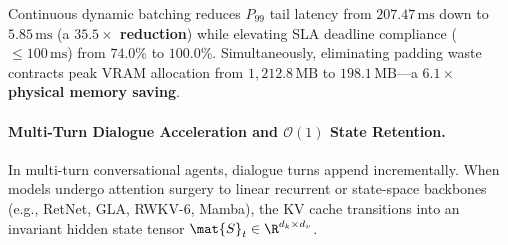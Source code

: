 \begin{table}[t]
\centering
\small
\caption[Dynamic Batch Scheduling vs Static Batching]{\textbf{Dynamic Batch Scheduling vs. Static Batching under Poisson Arrival Process ($N=100$ requests, $L \in [256, 4{,}096]$) on Physical NVIDIA RTX 4070 (AD104, SM 8.9).} Continuous iteration-level dynamic batching eliminates batch queue head-of-line blocking and padding waste. Across 100 stochastic arrivals ($230{,}229$ total tokens), continuous scheduling reduces $P_{99}$ latency from $207.47\,\text{ms}$ down to $5.85\,\text{ms}$ ($35.5\times$ reduction), achieving $100.0\%$ SLA deadline compliance ($\le 100\,\text{ms}$) while slashing peak memory footprint from $1{,}212.8\,\text{MB}$ to $198.1\,\text{MB}$ ($6.1\times$ reduction).}
\label{tab:dynamic_batching_benchmarks}
\setlength{\tabcolsep}{5pt}
\renewcommand{\arraystretch}{1.15}
\end{table}

Continuous dynamic batching reduces $P_{99}$ tail latency from $207.47\,\text{ms}$ down to $5.85\,\text{ms}$ (a \textbf{$35.5\times$ reduction}) while elevating SLA deadline compliance ($\le 100\,\text{ms}$) from $74.0\%$ to \textbf{$100.0\%$}. Simultaneously, eliminating padding waste contracts peak VRAM allocation from $1{,}212.8\,\text{MB}$ to $198.1\,\text{MB}$—a \textbf{$6.1\times$ physical memory saving}.

\paragraph{Multi-Turn Dialogue Acceleration and $\mathcal{O}(1)$ State Retention.}
In multi-turn conversational agents, dialogue turns append incrementally. When models undergo attention surgery to linear recurrent or state-space backbones (e.g., RetNet, GLA, RWKV-6, Mamba), the KV cache transitions into an invariant hidden state tensor $\mat{S}_t \in \R^{d_k \times d_v}$.

